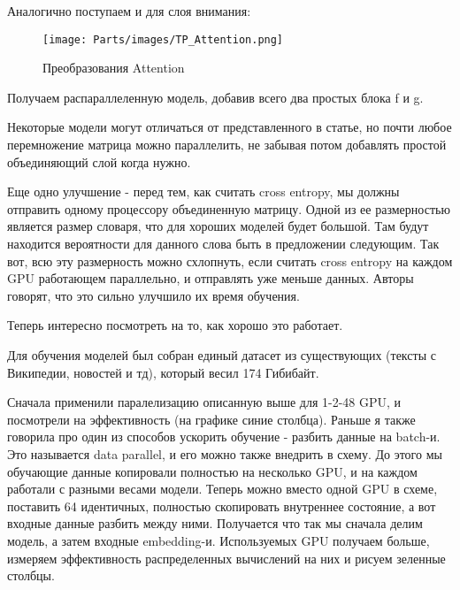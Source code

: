 Аналогично поступаем и для слоя внимания:

\begin{figure}[H]
    \centering
    \texttt{[image: Parts/images/TP\_Attention.png]}
    \caption{Преобразования Attention}
\end{figure}



Получаем распараллеленную модель, добавив всего два простых блока f и g.


Некоторые модели могут отличаться от представленного в статье, но почти любое перемножение матрица можно параллелить, не забывая потом добавлять простой объединяющий слой когда нужно. 

Еще одно  улучшение - перед тем, как считать cross entropy, мы должны отправить одному процессору объединенную матрицу. Одной из ее размерностью является размер словаря, что для хороших моделей будет большой. Там будут находится вероятности для данного слова быть в предложении следующим. Так вот, всю эту размерность можно схлопнуть, если считать  cross entropy на каждом GPU работающем параллельно, и отправлять уже меньше данных. Авторы говорят, что это сильно улучшило их время обучения. 

Теперь интересно посмотреть на то, как хорошо это работает.

Для обучения моделей был собран единый датасет из существующих (тексты с Википедии, новостей и тд), который весил 174 Гибибайт. 

Сначала применили паралелизацию описанную выше для 1-2-48 GPU, и посмотрели на эффективность (на графике синие столбца). Раньше я также говорила про один из способов ускорить обучение - разбить данные на batch-и. Это называется data parallel, и его можно также внедрить в схему. До этого мы обучающие данные копировали полностью на несколько GPU, и на каждом работали с разными весами модели. Теперь можно вместо одной GPU в схеме, поставить 64 идентичных, полностью скопировать внутреннее состояние, а вот входные данные разбить между ними. Получается что так мы сначала делим модель, а затем входные embedding-и. Используемых GPU получаем больше, измеряем эффективность распределенных вычислений на них и рисуем зеленные столбцы.

